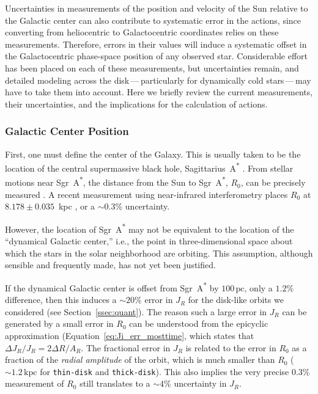 \documentclass[twocolumn]{aastex62}
\newcommand{\pc}{\text{pc}}
\newcommand{\kpc}{\text{kpc}}
\newcommand{\sgra}{Sgr~A\textsuperscript{*}}
\newcommand{\thin}{\texttt{thin-disk}}
\newcommand{\thick}{\texttt{thick-disk}}
\begin{document}
Uncertainties in measurements of the position and velocity of the Sun relative
to the Galactic center can also contribute to systematic error in the actions, since converting from heliocentric to Galactocentric
coordinates relies on these measurements. Therefore, errors in their values
will induce a systematic offset in the Galactocentric phase-space position of
any observed star. Considerable effort has been placed on each of these measurements, but uncertainties remain, and detailed modeling across the disk\,---\,particularly for dynamically cold stars\,---\,may have to take them into
account.
Here we briefly review the current measurements, their uncertainties, and the implications for the calculation of actions.

\subsubsection{Galactic Center Position}
First, one must define the center of the Galaxy. This is usually taken to be
the location of the central supermassive black hole, Sagittarius~A\textsuperscript{*}
\citep[\sgra{}, e.g.,][]{2004ApJ...616..872R}. From stellar motions near
\sgra{}, the distance from the Sun to \sgra{}, $R_0$, can be
precisely measured \citep{2009ApJ...692.1075G, 2018AA...615L..15G}. A
recent measurement using near-infrared interferometry places $R_0$ at $8.178 \pm 0.035$~kpc
\citep{2019arXiv190405721A}, or a $\sim0.3\%$ uncertainty.

However, the location of \sgra{} may not be equivalent to the location of the ``dynamical Galactic center,'' i.e., the
point in three-dimensional space about which the stars in the solar
neighborhood are orbiting. This assumption, although sensible and frequently
made, has not yet been justified.

If the dynamical Galactic center is offset from \sgra{} by $100\,\pc$, only a
$1.2\%$ difference, then this induces a $\sim20\%$ error in $J_R$ for the disk-like orbits we considered (see
Section~\ref{ssec:quant}). The reason such a large error in $J_R$ can be
generated by a small error in $R_0$ can be understood from the epicyclic
approximation (Equation~\eqref{eq:Ji_err_mosttime}, which states that $\Delta J_R/J_R = 2\Delta R/A_R$. The
fractional error in $J_R$ is related to the error in $R_0$ as a fraction of
the \emph{radial amplitude} of the orbit, which is much smaller than $R_0$
($\sim1.2\,\kpc$ for \thin{} and \thick{}). This
also implies the very precise $0.3\%$ measurement of $R_0$ still translates to
a $\sim4\%$ uncertainty in $J_R$.
\end{document}
